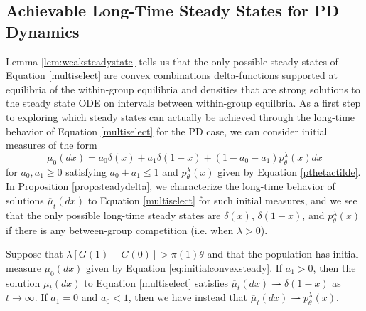 \documentclass[11pt]{article}
\numberwithin{equation}{section}
\newcommand{\ol}{\overline}
\begin{document}
{ \subsection{Achievable Long-Time Steady States for PD Dynamics}
\label{sec:steadycompetition}

 Lemma \ref{lem:weaksteadystate} tells us that the only possible steady states of Equation \eqref{multiselect} are convex combinations delta-functions supported at equilibria of the within-group equilibria and densities that are strong solutions to the steady state ODE on intervals between within-group equilbria. 
 As a first step to exploring which steady states can actually be achieved through the long-time behavior of Equation \eqref{multiselect} for the PD case, we can consider initial measures of the form
 \begin{equation} \label{eq:initialconvexsteady}
 \mu_0(dx) = a_0 \delta(x) + a_1 \delta(1-x) + \left( 1 - a_0 - a_1 \right) p^{\lambda}_{\theta}(x) dx
 \end{equation}
 for $a_0, a_1 \geq 0$ satisfying $a_0 + a_1 \leq 1$ and $p^{\lambda}_{\theta}(x)$ given by Equation \eqref{pthetactilde}. 
In Proposition \ref{prop:steadydelta}, we characterize the long-time behavior of solutions $\ol{\mu}_t(dx)$ to Equation \eqref{multiselect} for such initial measures, and we see that the only possible long-time steady states are $\delta(x)$, $\delta(1-x)$, and $p^{\lambda}_{\theta}(x)$ if there is any between-group competition (i.e. when $\lambda > 0$).

 \begin{proposition} \label{prop:steadydelta}
 Suppose that $\lambda \left[G(1) - G(0) \right] > \pi(1) \theta$ and that the population has initial measure $\mu_0(dx)$ given by Equation \eqref{eq:initialconvexsteady}. If $a_1 > 0$, then the solution $\mu_t(dx)$ to Equation \eqref{multiselect} satisfies $\ol{\mu}_t(dx) \rightharpoonup \delta(1-x)$ as $t \to \infty$. If $a_1 = 0$ and $a_0 < 1$, then we have instead that $\ol{\mu}_t(dx) \rightharpoonup p^{\lambda}_{\theta}(x)$.
 \end{proposition}

}
\end{document}
